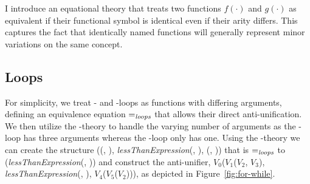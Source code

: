 I introduce an equational theory that treats two functions $f(\cdot)$ and $g(\cdot)$ as equivalent if their functional symbol is identical even if their arity differs.  This captures the fact that identically named functions will generally represent minor variations on the same concept.

\subsection{Loops}

For simplicity, we treat - and -loops as functions with differing arguments, defining an equivalence equation $=_{\mathit{loops}}$ that allows their direct anti-unification. We then utilize the \NIL{}-theory to handle the varying number of arguments as the -loop has three arguments whereas the -loop only has one. Using the \NIL{}-theory we can create the structure (\NIL{}(\NIL{}, \NIL{}), \textit{lessThanExpression}(, ), \NIL{}(\NIL{}, \NIL{})) that is $=_{\mathit{loops}}$ to (\textit{lessThanExpression}(, )) and construct the anti-unifier, $V_0$($V_1$($V_2$, $V_3$), \textit{lessThanExpression}(, ), $V_4$($V_5$($V_2$))), as depicted in Figure~\ref{fig:for-while}.

